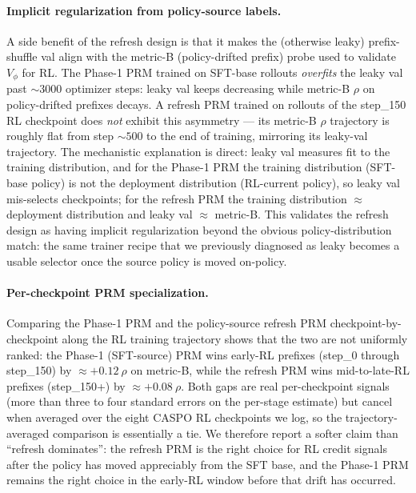 \documentclass[11pt]{article}
\begin{document}
\paragraph{Implicit regularization from policy-source labels.}
A side benefit of the refresh design is that it makes the (otherwise
leaky) prefix-shuffle val align with the metric-B (policy-drifted
prefix) probe used to validate $V_\phi$ for RL. The Phase-1 PRM
trained on SFT-base rollouts \emph{overfits} the leaky val past
${\sim}3000$ optimizer steps: leaky val keeps decreasing while
metric-B $\rho$ on policy-drifted prefixes decays. A refresh PRM
trained on rollouts of the step\_150 RL checkpoint does \emph{not}
exhibit this asymmetry --- its metric-B $\rho$ trajectory is roughly
flat from step ${\sim}500$ to the end of training, mirroring its
leaky-val trajectory. The mechanistic explanation is direct: leaky
val measures fit to the training distribution, and for the Phase-1
PRM the training distribution (SFT-base policy) is not the
deployment distribution (RL-current policy), so leaky val mis-selects
checkpoints; for the refresh PRM the training distribution
${\approx}$ deployment distribution and leaky val ${\approx}$ metric-B.
This validates the refresh design as having implicit regularization
beyond the obvious policy-distribution match: the same trainer recipe
that we previously diagnosed as leaky becomes a usable selector once
the source policy is moved on-policy.

\paragraph{Per-checkpoint PRM specialization.}
Comparing the Phase-1 PRM and the policy-source refresh PRM
checkpoint-by-checkpoint along the RL training trajectory shows
that the two are not uniformly ranked: the Phase-1 (SFT-source)
PRM wins early-RL prefixes (step\_0 through step\_150) by
${\approx}+0.12~\rho$ on metric-B, while the refresh PRM wins
mid-to-late-RL prefixes (step\_150+) by ${\approx}+0.08~\rho$. Both
gaps are real per-checkpoint signals (more than three to four
standard errors on the per-stage estimate) but cancel when averaged
over the eight CASPO RL checkpoints we log, so the
trajectory-averaged comparison is essentially a tie. We therefore
report a softer claim than ``refresh dominates'': the refresh PRM
is the right choice for RL credit signals after the policy has
moved appreciably from the SFT base, and the Phase-1 PRM remains
the right choice in the early-RL window before that drift has
occurred.
\end{document}
